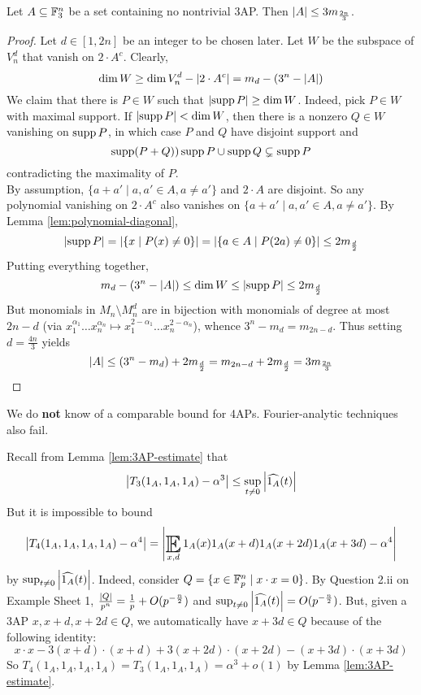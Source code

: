 \documentclass{article}
\begin{document}
\begin{nprop}
  Let $A \subseteq \mathbb F_3^n$ be a set containing no nontrivial 3AP. Then $\left\lvert A\right\rvert \le 3m_{\frac{2n}3}$.
\end{nprop}
\begin{proof}
  Let $d \in [1, 2n]$ be an integer to be chosen later. Let $W$ be the subspace of $V_n^d$ that vanish on $2 \cdot A^c$. Clearly,
  $$\dim W \ge \dim V_n^d - \left\lvert 2 \cdot A^c\right\rvert = m_d - (3^n - \left\lvert A\right\rvert)$$
  We claim that there is $P \in W$ such that $\left\lvert \operatorname{supp} P\right\rvert \ge \dim W$. Indeed, pick $P \in W$ with maximal support. If $\left\lvert \operatorname{supp} P\right\rvert < \dim W$, then there is a nonzero $Q \in W$ vanishing on $\operatorname{supp} P$, in which case $P$ and $Q$ have disjoint support and
  $$\operatorname{supp}(P + Q) ) \operatorname{supp} P \cup \operatorname{supp} Q \subsetneq \operatorname{supp} P$$
  contradicting the maximality of $P$. \\
  By assumption, $\{a + a' \mid a, a' \in A, a \ne a'\}$ and $2 \cdot A$ are disjoint. So any polynomial vanishing on $2 \cdot A^c$ also vanishes on $\{a + a' \mid a, a' \in A, a \ne a'\}$. By Lemma \ref{lem:polynomial-diagonal},
  $$\left\lvert \operatorname{supp} P\right\rvert = \left\lvert \{x \mid P(x) \ne 0\}\right\rvert = \left\lvert \{a \in A \mid P(2a) \ne 0\}\right\rvert \le 2m_{\frac d2}$$
  Putting everything together,
  $$m_d - (3^n - \left\lvert A\right\rvert) \le \dim W \le \left\lvert \operatorname{supp} P\right\rvert \le 2m_{\frac d2}$$
  But monomials in $M_n \setminus M_n^d$ are in bijection with monomials of degree at most $2n - d$ (via $x_1^{\alpha_1} \dots x_n^{\alpha_n} \mapsto x_1^{2 - \alpha_1} \dots x_n^{2 - \alpha_n}$), whence $3^n - m_d = m_{2n - d}$. Thus setting $d = \frac{4n}3$ yields
  $$\left\lvert A\right\rvert \le (3^n - m_d) + 2m_{\frac d2} = m_{2n - d} + 2m_{\frac d2} = 3m_{\frac{2n}3}$$
\end{proof}

We do {\bf not} know of a comparable bound for 4APs. Fourier-analytic techniques also fail.

\begin{nex}
  Recall from Lemma \ref{lem:3AP-estimate} that
  $$\left\lvert T_3(1_A, 1_A, 1_A) - \alpha^3\right\rvert \le \sup_{t \ne 0} \left\lvert \widehat{1_A}(t)\right\rvert$$
  But it is impossible to bound
  $$\abs{T_4(1_A, 1_A, 1_A, 1_A) - \alpha^4} = \abs{\E_{x, d} 1_A(x) 1_A(x + d) 1_A(x + 2d) 1_A(x + 3d) - \alpha^4}$$
  by $\sup_{t \ne 0} \left\lvert \widehat{1_A}(t)\right\rvert$. Indeed, consider $Q = \{x \in \mathbb F_p^n \mid x \cdot x = 0\}$. By Question 2.ii on Example Sheet 1, $\frac{\left\lvert Q\right\rvert}{p^n} = \frac 1p + O(p^{-\frac n2})$ and $\sup_{t \ne 0} \left\lvert \widehat{1_A}(t)\right\rvert = O(p^{-\frac n2})$. But, given a 3AP $x, x + d, x + 2d \in Q$, we automatically have $x + 3d \in Q$ because of the following identity:
  $$x \cdot x - 3(x + d) \cdot (x + d) + 3(x + 2d) \cdot (x + 2d) - (x + 3d) \cdot (x + 3d)$$
  So $T_4(1_A, 1_A, 1_A, 1_A) = T_3(1_A, 1_A, 1_A) = \alpha^3 + o(1)$ by Lemma \ref{lem:3AP-estimate}.
\end{nex}
\end{document}
